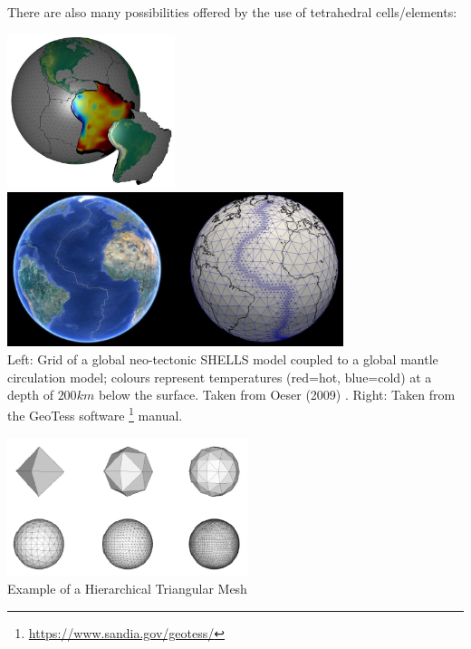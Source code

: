 There are also many possibilities offered by the use of tetrahedral cells/elements:


\begin{center}
\includegraphics[height=4.5cm]{images/meshes/oebm09}
\includegraphics[height=4.5cm]{images/meshes/geotess}\\
{\captionfont Left: Grid of a global neo-tectonic SHELLS model coupled to a global mantle
circulation model; colours represent temperatures (red=hot, blue=cold)
at a depth of $200\si{km}$ below the surface. Taken from Oeser \etal (2009) \cite{oebm09}.
Right: Taken from the GeoTess software \footnote{\url{https://www.sandia.gov/geotess/}} manual.}
\end{center}


\begin{center}
\includegraphics[width=7cm]{images/meshes/htm}\\
{\captionfont Example of a Hierarchical Triangular Mesh}
\end{center}



